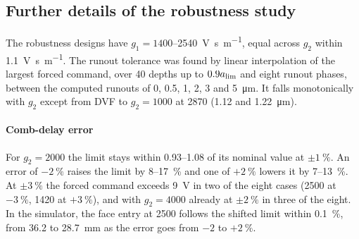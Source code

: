 \subsection{Further details of the robustness study}\label{supp:delayed-robust}

The robustness designs have $g_1=1400$--\SI{2540}{\volt\second\per\metre}, equal across $g_2$ within \SI{1.1}{\volt\second\per\metre}. The runout tolerance was found by linear interpolation of the largest forced command, over 40 depths up to $0.9a_{\lim}$ and eight runout phases, between the computed runouts of 0, 0.5, 1, 2, 3 and \SI{5}{\micro\metre}. It falls monotonically with $g_2$ except from DVF to $g_2=1000$ at \SI{2870}{\rpm} (1.12 and \SI{1.22}{\micro\metre}).

\paragraph{Comb-delay error} For $g_2=2000$ the limit stays within 0.93--1.08 of its nominal value at $\pm\SI{1}{\percent}$. An error of $-\SI{2}{\percent}$ raises the limit by 8--\SI{17}{\percent} and one of $+\SI{2}{\percent}$ lowers it by 7--\SI{13}{\percent}. At $\pm\SI{3}{\percent}$ the forced command exceeds \SI{9}{\volt} in two of the eight cases (\SI{2500}{\rpm} at $-\SI{3}{\percent}$, \SI{1420}{\rpm} at $+\SI{3}{\percent}$), and with $g_2=4000$ already at $\pm\SI{2}{\percent}$ in three of the eight. In the simulator, the face entry at \SI{2500}{\rpm} follows the shifted limit within \SI{0.1}{\percent}, from 36.2 to \SI{28.7}{\milli\metre} as the error goes from $-2$ to $+\SI{2}{\percent}$.

